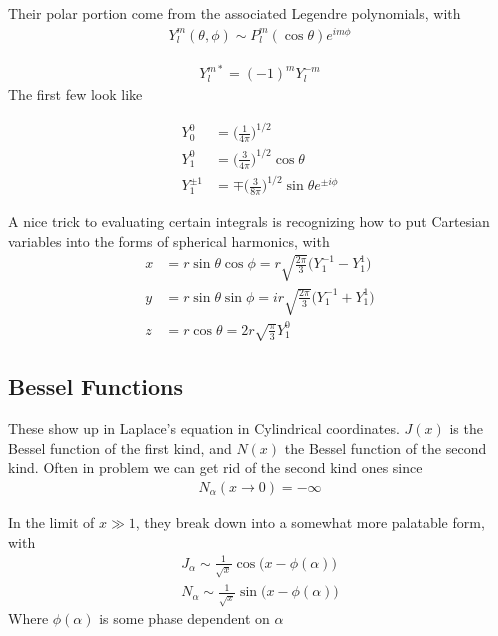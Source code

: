 Their polar portion come from the associated Legendre polynomials, with
\begin{align}
Y^m_l(\theta,\phi) \sim P_l^m(\cos\theta)e^{im\phi}
\end{align}


\begin{align}
Y^{m*}_{l}= (-1)^mY^{-m}_l
\end{align}
The first few look like

\begin{align}
Y_0^0 &= \Big(\frac{1}{4\pi}\Big)^{1/2}\\
Y_1^0 &= \Big(\frac{3}{4\pi}\Big)^{1/2}\cos\theta\\
Y_1^{\pm 1} &= \mp \Big(\frac{3}{8\pi}\Big)^{1/2}\sin\theta e^{\pm i\phi}
\end{align}

A nice trick to evaluating certain integrals is recognizing how to put Cartesian variables into the forms of spherical harmonics, with
\begin{align}
x &= r\sin\theta \cos\phi = r\sqrt{\frac{2\pi}{3}}\Big(Y^{-1}_1 - Y^1_1\Big)\\
y &= r\sin\theta\sin\phi = ir\sqrt{\frac{2\pi}{3}}\Big(Y^{-1}_1 + Y^1_1\Big)\\
z &= r\cos\theta = 2r\sqrt{\frac{\pi}{3}}Y_1^0
\end{align}


\subsection{Bessel Functions}\label{bessel}

These show up in Laplace's equation in Cylindrical coordinates. $J(x)$ is the Bessel function of the first kind, and $N(x)$ the Bessel function of the second kind. Often in problem we can get rid of the second kind ones since
\begin{align}
N_\alpha(x\rightarrow 0) =-\infty
\end{align}


In the limit of $x\gg 1$, they break down into a somewhat more palatable form, with
\begin{align}
J_\alpha \sim \frac{1}{\sqrt{x}}\cos\Big(x - \phi(\alpha)\Big)\\
N_\alpha \sim \frac{1}{\sqrt{x}}\sin\Big(x - \phi(\alpha)\Big)
\end{align}
Where $\phi(\alpha)$ is some phase dependent on $\alpha$ 



